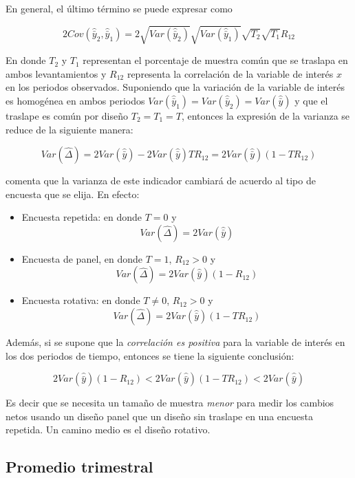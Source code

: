 \documentclass[
  12pt,
]{book}
\providecommand{\tightlist}{%
  \setlength{\itemsep}{0pt}\setlength{\parskip}{0pt}}
\begin{document}
En general, el último término se puede expresar como

\[
2Cov(\hat{\bar{y}}_2, \hat{\bar{y}}_1) = 
2\sqrt{Var(\hat{\bar{y}}_2)}\sqrt{Var(\hat{\bar{y}}_1)}\sqrt{T_2}\sqrt{T_1}R_{12}
\]

En donde \(T_2\) y \(T_1\) representan el porcentaje de muestra común que se
traslapa en ambos levantamientos y \(R_{12}\) representa la correlación de
la variable de interés \(x\) en los periodos observados. Suponiendo que la
variación de la variable de interés es homogénea en ambos periodos \(Var(\hat{\bar{y}}_1) = Var(\hat{\bar{y}}_2) = Var(\hat{\bar{y}})\) y que
el traslape es común por diseño \(T_2 = T_1 = T\), entonces la expresión de la varianza se
reduce de la siguiente manera:

\[
Var(\hat{\Delta}) = 2Var(\hat{\bar{y}}) - 2{Var(\hat{\bar{y}})}TR_{12}
=2Var(\hat{\bar{y}})(1-TR_{12}) 
\]

\citet{Kish_2004} comenta que la varianza de este indicador cambiará de acuerdo al tipo de
encuesta que se elija. En efecto:

\begin{itemize}
\tightlist
\item
  Encuesta repetida: en donde \(T=0\) y
  \[Var(\hat{\Delta}) = 2Var(\hat{\bar{y}})\]
\item
  Encuesta de panel, en donde \(T=1\), \(R_{12} > 0\) y
  \[Var(\hat{\Delta}) = 2Var(\hat{\bar{y}})(1-R_{12})\]
\item
  Encuesta rotativa: en donde \(T\neq 0\), \(R_{12} > 0\) y
  \[Var(\hat{\Delta}) = 2Var(\hat{\bar{y}})(1-TR_{12})\]
\end{itemize}

Además, si se supone que la \emph{correlación es positiva} para la variable de interés en los
dos periodos de tiempo, entonces se tiene la siguiente conclusión:

\[
2Var(\hat{\bar{y}})(1-R_{12}) < 2Var(\hat{\bar{y}})(1-TR_{12}) < 2Var(\hat{\bar{y}})
\]

Es decir que se necesita un tamaño de muestra \emph{menor} para medir los
cambios netos usando un diseño panel que un diseño sin traslape en una encuesta repetida. Un
camino medio es el diseño rotativo.

\hypertarget{promedio-trimestral}{%
\subsection{Promedio trimestral}\label{promedio-trimestral}}
\end{document}
